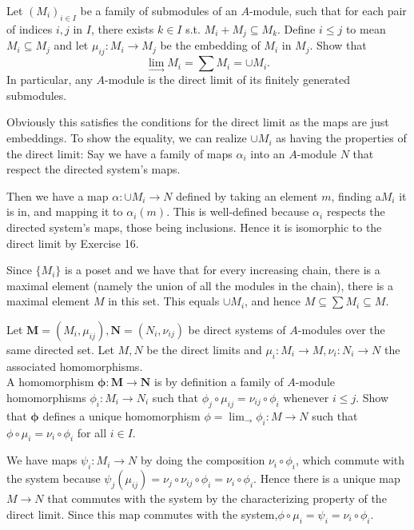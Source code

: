 \begin{questions}
	\question Let $(M_i)_{i\in I}$ be a family of submodules of an $A$-module, such that for each pair of indices $i,j$ in $I $, there exists $k\in I$ s.t. $M_i + M_j \subseteq M_k$. Define $i\le j$ to mean $M_i \subseteq M_j$ and let $\mu _{ij}: M_i\to M_j$ be the embedding of $M_i$ in $M_j$. Show that
	\[
		\lim_{\rightarrow} M_i = \sum M_i = \cup M_i
	.\]
	In particular, any $A$-module is the direct limit of its finitely generated submodules.
	\begin{solution}
		Obviously this satisfies the conditions for the direct limit as the maps are just embeddings.
		To show the equality, we can realize $\cup M_i$ as having the properties of the direct limit:
		Say we have a family of maps $\alpha _i$ into an $A$-module $N$ that respect the directed system's maps.

		Then we have a map $\alpha :\cup M_i \to N$ defined by taking an element $m $, finding a$ M_i$ it is in, and mapping it to $\alpha _i(m)$.
		This is well-defined because $\alpha _i$ respects the directed system's maps, those being inclusions.
		Hence it is isomorphic to the direct limit by Exercise 16.

		Since $\{M_i\}$ is a poset and we have that for every increasing chain, there is a maximal element (namely the union of all the modules in the chain), there is a maximal element $M$ in this set.
		This equals $\cup M_i $, and hence $M \subseteq \sum M_i \subseteq M$.
	\end{solution}

	\question Let $\bm{M} = (M_i, \mu_{ij}), \bm{N}=(N_i,\nu_{ij})$ be direct systems of $A$-modules over the same directed set. Let $M,N$ be the direct limits and $\mu _i: M_i\to M , \nu_i: N_i \to N$ the associated homomorphisms.\\
	A homomorphism $\bm{\phi}:\bm{M}\to \bm{N}$ is by definition a family of $A$-module homomorphisms $\phi_i:M_i\to N_i$ such that $\phi _j \circ \mu_{ij}=\nu_{ij}\circ \phi_i$ whenever $i\le j$. Show that $\bm{\phi}$ defines a unique homomorphism $\phi = \lim_{\rightarrow} \phi_i: M\to N$ such that $\phi\circ \mu_i = \nu_i\circ \phi_i$ for all $i\in I$.
	\begin{solution}
		We have maps $\psi_i: M_i\to N$ by doing the composition $\nu_i\circ \phi_i $, which commute with the system because $\psi_j(\mu_{ij}) = \nu_j\circ \nu_{ij}\circ \phi_i = \nu_i\circ \phi_i$.
		Hence there is a unique map $M\to N$ that commutes with the system by the characterizing property of the direct limit.
		Since this map commutes with the system,$\phi\circ \mu_i = \psi_i = \nu_i \circ \phi_i$.
	\end{solution}


\end{questions}
